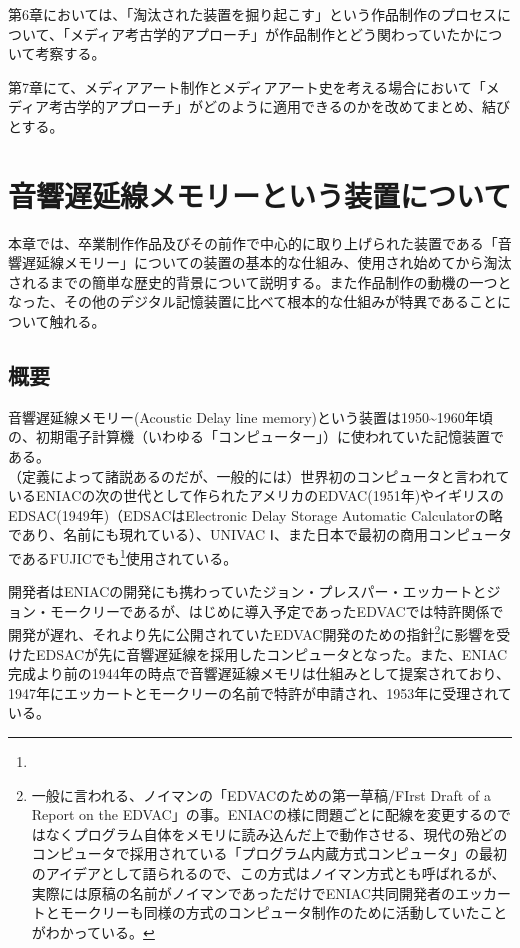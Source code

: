 \documentclass[a4paper,report]{jsbook}
\begin{document}
第6章においては、「淘汰された装置を掘り起こす」という作品制作のプロセスについて、「メディア考古学的アプローチ」が作品制作とどう関わっていたかについて考察する。

第7章にて、メディアアート制作とメディアアート史を考える場合において「メディア考古学的アプローチ」がどのように適用できるのかを改めてまとめ、結びとする。

\chapter{音響遅延線メモリーという装置について}\label{ux97f3ux97ffux9045ux5ef6ux7ddaux30e1ux30e2ux30eaux30fcux3068ux3044ux3046ux88c5ux7f6eux306bux3064ux3044ux3066}

本章では、卒業制作作品及びその前作で中心的に取り上げられた装置である「音響遅延線メモリー」についての装置の基本的な仕組み、使用され始めてから淘汰されるまでの簡単な歴史的背景について説明する。また作品制作の動機の一つとなった、その他のデジタル記憶装置に比べて根本的な仕組みが特異であることについて触れる。

\section{概要}\label{ux6982ux8981}

音響遅延線メモリー(Acoustic Delay line
memory)という装置は1950\textasciitilde{}1960年頃の、初期電子計算機（いわゆる「コンピューター」）に使われていた記憶装置である。\\
（定義によって諸説あるのだが、一般的には）世界初のコンピュータと言われているENIACの次の世代として作られたアメリカのEDVAC(1951年)やイギリスのEDSAC(1949年)（EDSACはElectronic
Delay Storage Automatic
Calculatorの略であり、名前にも現れている）、UNIVAC
Ⅰ、また日本で最初の商用コンピュータであるFUJICでも\footnote{}使用されている。

開発者はENIACの開発にも携わっていたジョン・プレスパー・エッカートとジョン・モークリーであるが、はじめに導入予定であったEDVACでは特許関係で開発が遅れ、それより先に公開されていたEDVAC開発のための指針\footnote{一般に言われる、ノイマンの「EDVACのための第一草稿/FIrst
  Draft of a Report on the
  EDVAC」の事。ENIACの様に問題ごとに配線を変更するのではなくプログラム自体をメモリに読み込んだ上で動作させる、現代の殆どのコンピュータで採用されている「プログラム内蔵方式コンピュータ」の最初のアイデアとして語られるので、この方式はノイマン方式とも呼ばれるが、実際には原稿の名前がノイマンであっただけでENIAC共同開発者のエッカートとモークリーも同様の方式のコンピュータ制作のために活動していたことがわかっている。}に影響を受けたEDSACが先に音響遅延線を採用したコンピュータとなった。また、ENIAC完成より前の1944年の時点で音響遅延線メモリは仕組みとして提案されており、1947年にエッカートとモークリーの名前で特許が申請され、1953年に受理されている\autocite{eckert1953memory}。
\end{document}
